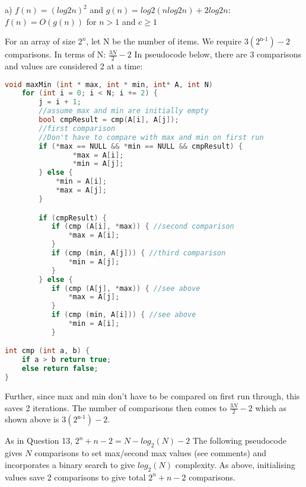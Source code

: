 \documentclass[11pt, a4paper]{article}
\begin{document}
a) $f(n) =(log 2 n)^2 $ and $g(n) =log 2 (n log 2 n ) + 2 log 2 n $: $f(n) = O(g(n))$ for $n > 1$ and $c \ge 1$



For an array of size $2^n$, let N be the number of items.
We require $3(2^\text{n-1})-2$ comparisons. In terms of N: $\frac{3N}{2} - 2$
In pseudocode below, there are 3 comparisons and values are considered 2 at a time:

\begin{lstlisting}[frame=single, language=c]
void maxMin (int * max, int * min, int* A, int N)
    for (int i = 0; i < N; i += 2) {
        j = i + 1;
        //assume max and min are initially empty
        bool cmpResult = cmp(A[i], A[j]);
        //first comparison
        //Don't have to compare with max and min on first run
        if (*max == NULL && *min == NULL && cmpResult) {
                *max = A[i];
                *min = A[j];
        } else {
            *min = A[i];
            *max = A[j];
        }

        if (cmpResult) {
           if (cmp (A[i], *max)) { //second comparison
               *max = A[i];
           } 
           if (cmp (min, A[j])) { //third comparison
               *min = A[j];
           }
        } else {
           if (cmp (A[j], *max)) { //see above
               *max = A[j];
           } 
           if (cmp (min, A[i])) { //see above
               *min = A[i];
           }

int cmp (int a, b) {
    if a > b return true;
    else return false;
}
\end{lstlisting}

Further, since max and min don't have to be compared on first run through, this saves 2 iterations.
The number of comparisons then comes to $\frac{3N}{2} - 2$ which as shown above is $3(2^\text{n-1})-2$.


As in Question 13, $2^n + n -2 = N - log_2 (N) - 2$
The following pseudocode gives $N$ comparisons to set max/second max values (see comments) and incorporates a binary search to give $log_2 (N)$ complexity. As above, initialising values save 2 comparisons to give total $2^n + n - 2$ comparisons.
\end{document}
